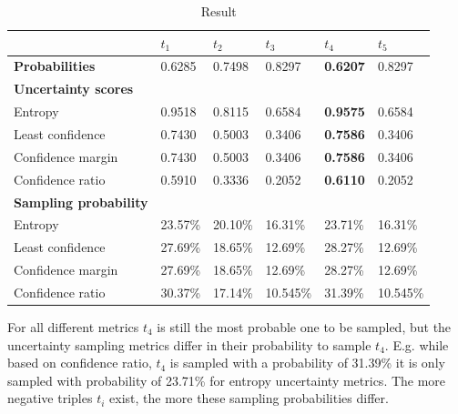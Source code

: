 \begin{table}[h]
    \centering
    \begin{tabular}{llllll}
        \toprule
        
        &  \textbf{$t_1$} & \textbf{$t_2$} & \textbf{$t_3$} & \textbf{$t_4$} & \textbf{$t_5$} \\
         
        \midrule
        
        \textbf{Probabilities}
        & 0.6285 & 0.7498 & 0.8297 & \textbf{0.6207} & 0.8297   \\
        
        \midrule
        \textbf{Uncertainty scores}
        & & & & & \\
        
        Entropy 
        & 0.9518 & 0.8115 &  0.6584 & \textbf{0.9575} & 0.6584 \\
        
        Least confidence 
        & 0.7430 & 0.5003 & 0.3406 & \textbf{0.7586} & 0.3406 \\ 
        
        Confidence margin
        & 0.7430 & 0.5003 & 0.3406 & \textbf{0.7586} & 0.3406 \\
        
        Confidence ratio
        & 0.5910 & 0.3336 & 0.2052 & \textbf{0.6110} & 0.2052 \\
        
        \midrule
        \textbf{Sampling probability}
        & & & & & \\
        
        Entropy 
        & 23.57\% & 20.10\% & 16.31\% & 23.71\% & 16.31\% \\
        
        Least confidence 
        & 27.69\% & 18.65\% & 12.69\% & 28.27\% & 12.69\% \\ 
       
        Confidence margin
        & 27.69\% & 18.65\% & 12.69\% & 28.27\% & 12.69\% \\ 
        
        Confidence ratio
        & 30.37\% & 17.14\% & 10.545\% & 31.39\% & 10.545\% \\
        
        \bottomrule
    \end{tabular}
    \caption{Result}
\label{tab:uncertainty_metrics_example_distribution}
\end{table}
For all different metrics $t_4$ is still the most probable one to be sampled, but the uncertainty sampling metrics differ in their probability to sample $t_4$.
E.g. while based on confidence ratio, $t_4$ is sampled with a probability of 31.39\% it is only sampled with probability of 23.71\% for entropy uncertainty metrics.
The more negative triples $t_i$ exist, the more these sampling probabilities differ.